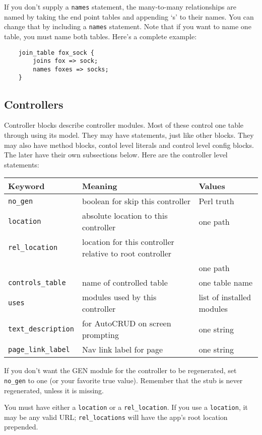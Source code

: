If you don't supply a \verb+names+ statement, the many-to-many relationships
are named by taking the end point tables and appending `s' to their names.
You can change that by including a \verb+names+ statement.  Note that if you
want to name one table, you must name both tables.  Here's a complete
example:

\begin{verbatim}
    join_table fox_sock {
        joins fox => sock;
        names foxes => socks;
    }
\end{verbatim}

\subsection*{Controllers}

Controller blocks describe controller modules.  Most of these control
one table through using its model.  They may have statements, just like
other blocks.  They may also have method blocks, contol level literals
and control level config blocks.  The later have their own subsections
below.  Here are the controller level statements:

\begin{tabular}{l|l|l}
Keyword & Meaning & Values \\
\hline
\verb+no_gen+ & boolean for skip this controller & Perl truth \\
\verb+location+ & absolute location to this controller & one path \\
\verb+rel_location+ & location for this controller relative to root controller
                    & \\
                & & one path \\
\verb+controls_table+ & name of controlled table & one table name \\
\verb+uses+ & modules used by this controller & list of installed modules \\
\verb+text_description+ & for AutoCRUD on screen prompting & one string \\
\verb+page_link_label+ & Nav link label for page & one string \\
\end{tabular}

If you don't want the GEN module for the controller to be regenerated,
set \verb+no_gen+ to one (or your favorite true value).  Remember that
the stub is never regenerated, unless it is missing.

You must have either a \verb+location+ or a \verb+rel_location+.  If you
use a \verb+location+, it may be any valid URL; \verb+rel_locations+ will
have the app's root location prepended.

